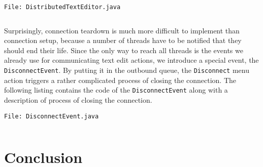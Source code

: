 \documentclass[a4paper,draft,12pt,oneside,article,table]{memoir}
\newcommand{\srcpath}{../ex09/src/main/java/ddist}
\newcommand{\inmnt}[3]{\noindent\texttt{\color{gray}File: #3}\vspace{-1em}\inputminted[tabsize=4,firstline=#1,firstnumber=#1,lastline=#2,linenos]{java}{\srcpath/#3}}
\newcommand{\mil}[1]{\texttt{#1}}
\begin{document}
\inmnt{230}{240}{DistributedTextEditor.java}

Surprisingly, connection teardown is much more difficult to implement
than connection setup, because a number of threads have to be notified
that they should end their life. Since the only way to reach all threads
is the events we already use for communicating text edit actions, we
introduce a special event, the \mil{DisconnectEvent}. By putting it in
the outbound queue, the \mil{Disconnect} menu action triggers a rather
complicated process of closing the connection. The following listing
contains the code of the \mil{DisconnectEvent} along with a description
of process of closing the connection.

\inmnt{1}{1000}{DisconnectEvent.java}


\chapter{Conclusion}

\end{document}
